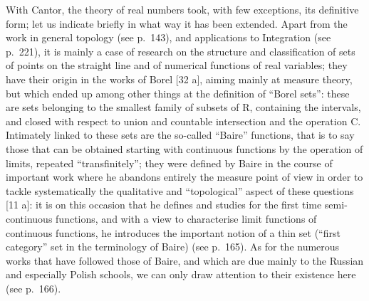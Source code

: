 With Cantor, the theory of real numbers took, with few exceptions, its definitive form; let us indicate briefly in what way it has been extended. Apart from the work in general topology (see p.~143), and applications to Integration (see p.~221), it is mainly a case of research on the structure and classification of sets of points on the straight line and of numerical functions of real variables; they have their origin in the works of Borel {[}32 a{]}, aiming mainly at measure theory, but which ended up among other things at the definition of ``Borel sets'': these are sets belonging to the smallest family of subsets of R, containing the intervals, and closed with respect to union and countable intersection and the operation C. Intimately linked to these sets are the so-called ``Baire'' functions, that is to say those that can be obtained starting with continuous functions by the operation of limits, repeated ``transfinitely''; they were defined by Baire in the course of important work where he abandons entirely the measure point of view in order to tackle systematically the qualitative and ``topological'' aspect of these questions {[}11 a{]}: it is on this occasion that he defines and studies for the first time semi-continuous functions, and with a view to characterise limit functions of continuous functions, he introduces the important notion of a thin set (``first category'' set in the terminology of Baire) (see p.~165). As for the numerous works that have followed those of Baire, and which are due mainly to the Russian and especially Polish schools, we can only draw attention to their existence here (see p.~166).


